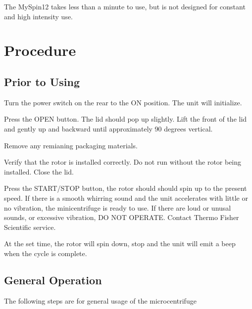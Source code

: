 \documentclass[12pt]{../SOP3_beta}\usepackage[]{graphicx}\usepackage[]{color}
\begin{document}
\NP The MySpin12 takes less than a minute to use, but is not designed for constant and high intensity use. 

\section{Procedure}

\subsection*{Prior to Using} 

\NP Turn the power switch on the rear to the ON position. The unit will initialize.

\NP Press the OPEN button. The lid should pop up slightly. Lift the front of the lid and gently up and backward until approximately 90 degrees vertical. 

\NP Remove any remianing packaging materials. 

\NP Verify that the rotor is installed correctly. Do not run without the rotor being installed. Close the lid.

\NP Press the START/STOP button, the rotor should should spin up to the present speed. If there is a smooth whirring sound and the unit accelerates with little or no vibration, the minicentrifuge is ready to use. If there are loud or unusal sounds, or excessive vibration, DO NOT OPERATE. Contact Thermo Fisher Scientific service.

\NP At the set time, the rotor will spin down, stop and the unit will emit a beep when the cycle is complete. 

\subsection*{General Operation}

\NP The following steps are for general usage of the microcentrifuge
\end{document}
